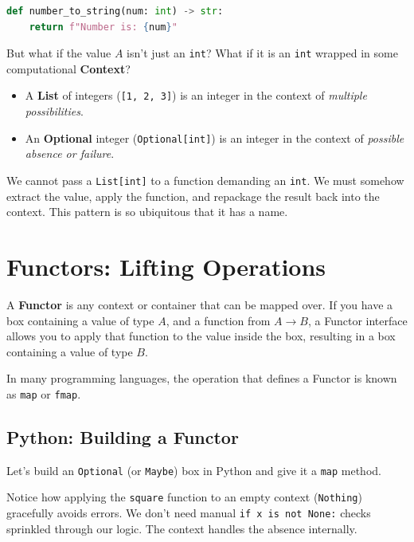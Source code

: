 \begin{lstlisting}[language=Python, caption={A simple function}, label={lst:simple_func}]
def number_to_string(num: int) -> str:
    return f"Number is: {num}"
\end{lstlisting}

But what if the value $A$ isn't just an \texttt{int}? What if it is an \texttt{int} wrapped in some computational \textbf{Context}?
\begin{itemize}
    \item A \textbf{List} of integers (\texttt{[1, 2, 3]}) is an integer in the context of \textit{multiple possibilities}.
    \item An \textbf{Optional} integer (\texttt{Optional[int]}) is an integer in the context of \textit{possible absence or failure}.
\end{itemize}

We cannot pass a \texttt{List[int]} to a function demanding an \texttt{int}. We must somehow extract the value, apply the function, and repackage the result back into the context. This pattern is so ubiquitous that it has a name.

\section{Functors: Lifting Operations}

A \textbf{Functor} is any context or container that can be mapped over. If you have a box containing a value of type $A$, and a function from $A \rightarrow B$, a Functor interface allows you to apply that function to the value inside the box, resulting in a box containing a value of type $B$.

In many programming languages, the operation that defines a Functor is known as \texttt{map} or \texttt{fmap}. 

\subsection{Python: Building a Functor}
Let's build an \texttt{Optional} (or \texttt{Maybe}) box in Python and give it a \texttt{map} method.



Notice how applying the \texttt{square} function to an empty context (\texttt{Nothing}) gracefully avoids errors. We don't need manual \texttt{if x is not None:} checks sprinkled through our logic. The context handles the absence internally.

